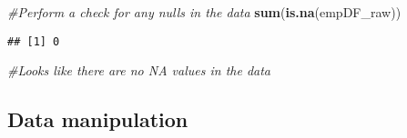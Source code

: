 \documentclass[]{article}
\newenvironment{Shaded}{\begin{snugshade}}{\end{snugshade}}
\newcommand{\KeywordTok}[1]{\textcolor[rgb]{0.13,0.29,0.53}{\textbf{#1}}}
\newcommand{\CommentTok}[1]{\textcolor[rgb]{0.56,0.35,0.01}{\textit{#1}}}
\newcommand{\NormalTok}[1]{#1}
\begin{document}
\begin{Shaded}
\begin{Highlighting}[]
\CommentTok{#Perform a check for any nulls in the data}
\KeywordTok{sum}\NormalTok{(}\KeywordTok{is.na}\NormalTok{(empDF_raw))}
\end{Highlighting}
\end{Shaded}

\begin{verbatim}
## [1] 0
\end{verbatim}

\begin{Shaded}
\begin{Highlighting}[]
\CommentTok{#Looks like there are no NA values in the data}
\end{Highlighting}
\end{Shaded}

\subsection{Data manipulation}\label{data-manipulation}
\end{document}
